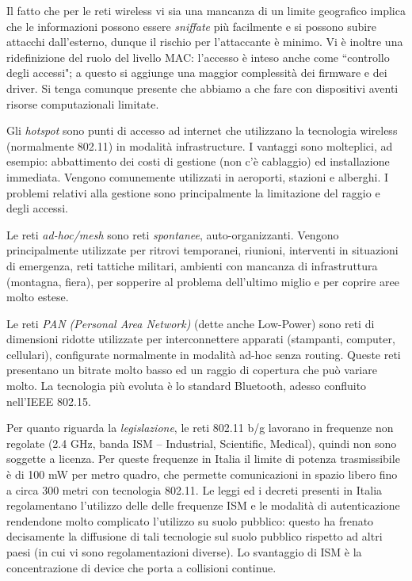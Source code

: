 Il fatto che per le reti wireless vi sia una mancanza di un limite geografico implica che le informazioni possono essere \textit{sniffate} più facilmente e si possono subire attacchi dall'esterno, dunque il rischio per l'attaccante è minimo. Vi è inoltre una ridefinizione del ruolo del livello MAC: l'accesso è inteso anche come \textquotedblleft controllo degli accessi"; a questo si aggiunge una maggior complessità dei firmware e dei driver. Si tenga comunque presente che abbiamo a che fare con dispositivi aventi risorse computazionali limitate.

Gli \textit{hotspot} sono punti di accesso ad internet che utilizzano la tecnologia wireless (normalmente 802.11) in modalità infrastructure. I vantaggi sono molteplici, ad esempio: abbattimento dei costi di gestione (non c'è cablaggio) ed installazione immediata. Vengono comunemente utilizzati in aeroporti, stazioni e alberghi. I problemi relativi alla gestione sono principalmente la limitazione del raggio e degli accessi.

Le reti \textit{ad-hoc/mesh} sono reti \textit{spontanee}, auto-organizzanti. Vengono principalmente utilizzate per ritrovi temporanei, riunioni, interventi in situazioni di emergenza, reti tattiche militari, ambienti con mancanza di infrastruttura (montagna, fiera), per sopperire al problema dell'ultimo miglio e per coprire aree molto estese.

Le reti \textit{PAN (Personal Area Network)} (dette anche Low-Power) sono reti di dimensioni ridotte utilizzate per interconnettere apparati (stampanti, computer, cellulari), configurate normalmente in modalità ad-hoc senza routing. Queste reti presentano un bitrate molto basso ed un raggio di copertura che può variare molto. La tecnologia più evoluta è lo standard Bluetooth, adesso confluito nell'IEEE 802.15.

Per quanto riguarda la \textit{legislazione}, le reti 802.11 b/g lavorano in frequenze non regolate (2.4 GHz, banda ISM -- Industrial, Scientific, Medical), quindi non sono soggette a licenza. Per queste frequenze in Italia il limite di potenza trasmissibile è di 100 mW per metro quadro, che permette comunicazioni in spazio libero fino a circa 300 metri con tecnologia 802.11. Le leggi ed i decreti presenti in Italia regolamentano l'utilizzo delle delle frequenze ISM e le modalità di autenticazione rendendone molto complicato l'utilizzo su suolo pubblico: questo ha frenato decisamente la diffusione di tali tecnologie sul suolo pubblico rispetto ad altri paesi (in cui vi sono regolamentazioni diverse). Lo svantaggio di ISM è la concentrazione di device che porta a collisioni continue.

